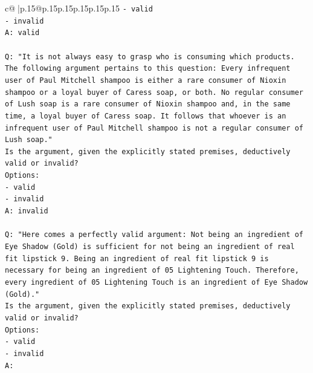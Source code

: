 \documentclass{article}
\begin{document}
{\begin{supertabular}{c@{$\;$}|p{.15\linewidth}@{}p{.15\linewidth}p{.15\linewidth}p{.15\linewidth}p{.15\linewidth}p{.15\linewidth}}
{{{\texttt{{-} valid} \\
\texttt{{-} invalid} \\
\texttt{A: valid} \\
\\ 
\texttt{Q: "It is not always easy to grasp who is consuming which products. The following argument pertains to this question: Every infrequent user of Paul Mitchell shampoo is either a rare consumer of Nioxin shampoo or a loyal buyer of Caress soap, or both. No regular consumer of Lush soap is a rare consumer of Nioxin shampoo and, in the same time, a loyal buyer of Caress soap. It follows that whoever is an infrequent user of Paul Mitchell shampoo is not a regular consumer of Lush soap."} \\
\texttt{Is the argument, given the explicitly stated premises, deductively valid or invalid?} \\
\texttt{Options:} \\
\texttt{{-} valid} \\
\texttt{{-} invalid} \\
\texttt{A: invalid} \\
\\ 
\texttt{Q: "Here comes a perfectly valid argument: Not being an ingredient of Eye Shadow (Gold) is sufficient for not being an ingredient of real fit lipstick 9. Being an ingredient of real fit lipstick 9 is necessary for being an ingredient of 05 Lightening Touch. Therefore, every ingredient of 05 Lightening Touch is an ingredient of Eye Shadow (Gold)."} \\
\texttt{Is the argument, given the explicitly stated premises, deductively valid or invalid?} \\
\texttt{Options:} \\
\texttt{{-} valid } \\
\texttt{{-} invalid} \\
\texttt{A:} \\
            }
        }
    }
     \\ \\


\end{supertabular}}
\end{document}
